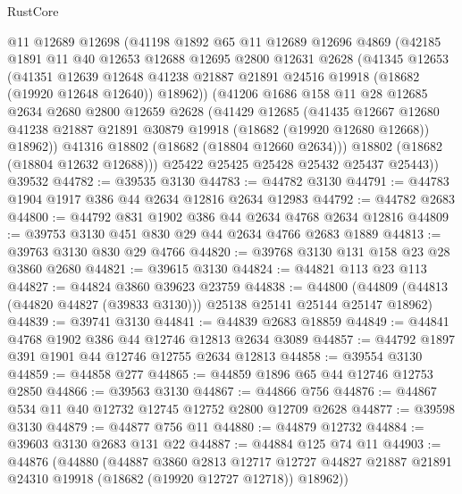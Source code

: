 \begin{lexlean}{RustCore}
\begin{coremodule}
      @11
      @12689
      @12698
      (@41198
        @1892
        @65
        @11
        @12689
        @12696
        @4869
        (@42185
          @1891
          @11
          @40
          @12653
          @12688
          @12695
          @2800
          @12631
          @2628
          (@41345
            @12653
            (@41351
              @12639
              @12648
              @41238
              @21887
              @21891
              @24516
              @19918
              (@18682 (@19920 @12648 @12640))
              @18962))
          (@41206
            @1686
            @158
            @11
            @28
            @12685
            @2634
            @2680
            @2800
            @12659
            @2628
            (@41429
              @12685
              (@41435
                @12667
                @12680
                @41238
                @21887
                @21891
                @30879
                @19918
                (@18682 (@19920 @12680 @12668))
                @18962))
            @41316
            @18802
            (@18682 (@18804 @12660 @2634)))
          @18802
          (@18682 (@18804 @12632 @12688)))
        @25422
        @25425
        @25428
        @25432
        @25437
        @25443))
    @39532
@44782 := @39535 @3130
@44783 := @44782 @3130
@44791 := @44783 @1904 @1917 @386 @44 @2634 @12816 @2634 @12983
@44792 := @44782 @2683
@44800 := @44792 @831 @1902 @386 @44 @2634 @4768 @2634 @12816
@44809 := @39753 @3130 @451 @830 @29 @44 @2634 @4766 @2683 @1889
@44813 := @39763 @3130 @830 @29 @4766
@44820 := @39768 @3130 @131 @158 @23 @28 @3860 @2680
@44821 := @39615 @3130
@44824 := @44821 @113 @23 @113
@44827 := @44824 @3860 @39623 @23759
@44838 := @44800 (@44809 (@44813 (@44820 @44827 (@39833 @3130))) @25138 @25141 @25144 @25147 @18962)
@44839 := @39741 @3130
@44841 := @44839 @2683 @18859
@44849 := @44841 @4768 @1902 @386 @44 @12746 @12813 @2634 @3089
@44857 := @44792 @1897 @391 @1901 @44 @12746 @12755 @2634 @12813
@44858 := @39554 @3130
@44859 := @44858 @277
@44865 := @44859 @1896 @65 @44 @12746 @12753 @2850
@44866 := @39563 @3130
@44867 := @44866 @756
@44876 := @44867 @534 @11 @40 @12732 @12745 @12752 @2800 @12709 @2628
@44877 := @39598 @3130
@44879 := @44877 @756 @11
@44880 := @44879 @12732
@44884 := @39603 @3130 @2683 @131 @22
@44887 := @44884 @125 @74 @11
@44903 := @44876
    (@44880
      (@44887
        @3860
        @2813
        @12717
        @12727
        @44827
        @21887
        @21891
        @24310
        @19918
        (@18682 (@19920 @12727 @12718))
        @18962))

\end{coremodule}
\end{lexlean}

